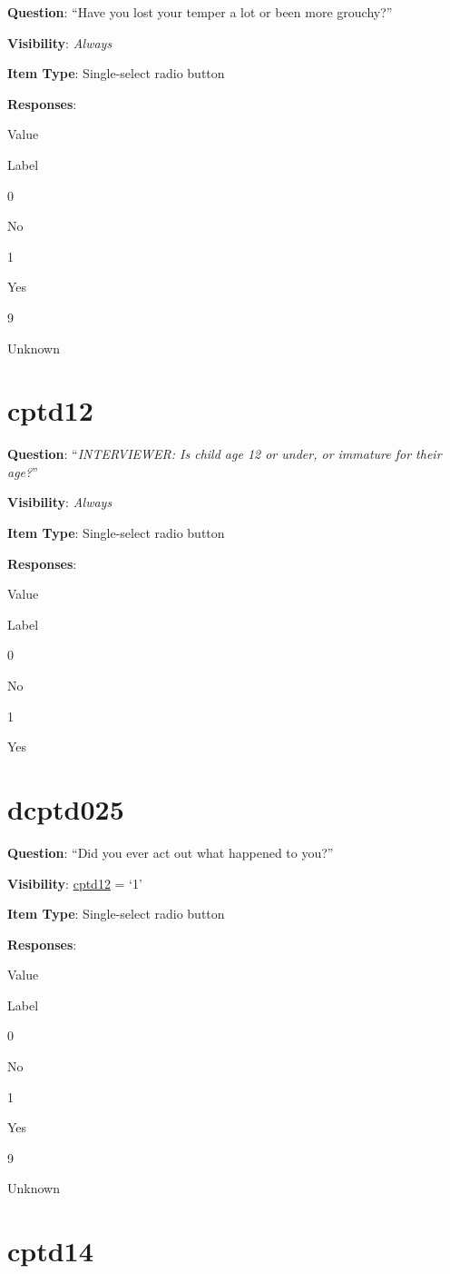\documentclass[]{book}
\begin{document}
\textbf{Question}: ``Have you lost your temper a lot or been more grouchy?''

\textbf{Visibility}: \emph{Always}

\textbf{Item Type}: Single-select radio button

\textbf{Responses}:

Value

Label

0

No

1

Yes

9

Unknown

\hypertarget{cptd12}{%
\section{cptd12}\label{cptd12}}

\textbf{Question}: ``\emph{INTERVIEWER: Is child age 12 or under, or immature for their age?}''

\textbf{Visibility}: \emph{Always}

\textbf{Item Type}: Single-select radio button

\textbf{Responses}:

Value

Label

0

No

1

Yes

\hypertarget{dcptd025}{%
\section{dcptd025}\label{dcptd025}}

\textbf{Question}: ``Did you ever act out what happened to you?''

\textbf{Visibility}: \protect\hyperlink{cptd12}{cptd12} = `1'

\textbf{Item Type}: Single-select radio button

\textbf{Responses}:

Value

Label

0

No

1

Yes

9

Unknown

\hypertarget{cptd14}{%
\section{cptd14}\label{cptd14}}
\end{document}

